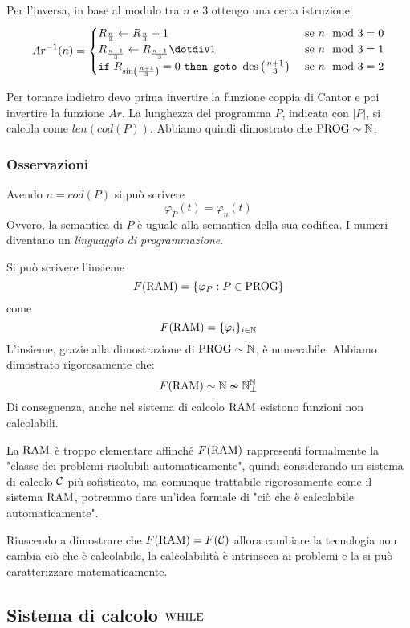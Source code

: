 Per l'inversa, in base al modulo tra $n$ e 3 ottengo una certa istruzione: 
$$
Ar^{-1} (n) = \begin{cases}
	R_{\frac{n}{3}} \leftarrow R_{\frac{n}{3}} + 1 & \text{ se } n \mod 3 = 0 \\
	R_{\frac{n-1}{3}} \leftarrow R_{\frac{n-1}{3}} \dotminus 1 & \text{ se } n \mod 3 = 1 \\
	\text{\texttt{if} } R_{\sin\left(\frac{n+1}{3}\right)} = 0 \text{ \texttt{then goto} } \des\left(\frac{n+1}{3}\right) & \text{ se } n \mod 3 = 2 \\
\end{cases}
$$

Per tornare indietro devo prima invertire la funzione coppia di Cantor e poi invertire la funzione $Ar$.
La lunghezza del programma $P$, indicata con $|P|$, si calcola come $len(cod(P))$. Abbiamo quindi dimostrato che $\text{PROG} \sim \mathbb{N}$.  %

\subsubsection{Osservazioni}
Avendo $n = cod(P)$ si può scrivere
$$ \varphi_P (t) = \varphi_n (t) $$
Ovvero, la semantica di $P$ è uguale alla semantica della sua codifica. I numeri diventano un \textit{linguaggio di programmazione}.

Si può scrivere l'insieme 
$$ F(\text{RAM}) = \{\varphi_P: P \in \text{PROG} \}$$
come 
$$ F(\text{RAM}) = \{\varphi_i\}_{i \in \mathbb{N}} $$
L'insieme, grazie alla dimostrazione di $\text{PROG} \sim \mathbb{N}$, è numerabile. Abbiamo dimostrato rigorosamente che:
$$ F(\text{RAM}) \sim \mathbb{N} \nsim \mathbb{N}^{\mathbb{N}}_\bot $$
Di conseguenza, anche nel sistema di calcolo $\text{RAM}$ esistono funzioni non calcolabili.

La $\text{RAM}$ è troppo elementare affinché $F(\text{RAM})$ rappresenti formalmente la "classe dei problemi risolubili automaticamente", quindi considerando un sistema di calcolo $\mathcal{C}$ più sofisticato, ma comunque trattabile rigorosamente come il sistema $\text{RAM}$, potremmo dare un'idea formale di "ciò che è calcolabile automaticamente". 

Riuscendo a dimostrare che $F(\text{RAM}) = F(\mathcal{C})$ allora cambiare la tecnologia non cambia ciò che è calcolabile, la calcolabilità è intrinseca ai problemi e la si può caratterizzare matematicamente.

\subsection{Sistema di calcolo $\text{WHILE}$}

